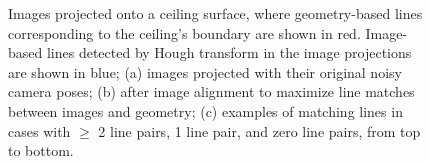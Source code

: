 \documentclass[]{spie}  %
\begin{document}
\begin{figure}
  \centering

  \centering

  \centering {}

  \caption{Images projected onto a ceiling surface, where
    geometry-based lines corresponding to the ceiling's boundary are
    shown in red. Image-based lines detected by Hough transform in the
    image projections are shown in blue; (a) images projected with
    their original noisy camera poses; (b) after image alignment to
    maximize line matches between images and geometry; (c) examples of
    matching lines in cases with $\geq$ 2 line pairs, 1 line pair, and
    zero line pairs, from top to bottom.}
  \label{fig:geometryAlignment}
\end{figure}
\end{document}
